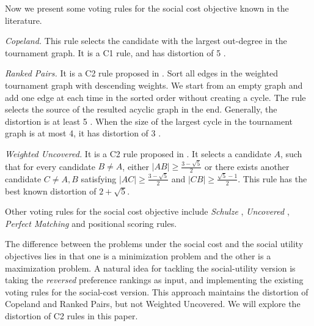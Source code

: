 \documentclass[11pt]{article}
\theoremstyle{remark}
\newcommand{\redcomment}[1]{\textcolor{red}{\textrm{#1}}}
\begin{document}
Now we present some voting rules for the social cost objective known in the literature.

\emph{Copeland.} This rule selects the candidate with the largest out-degree in the tournament graph. It is a C1 rule, and has distortion of 5 \cite{anshelevich2015approximating}.

\emph{Ranked  Pairs.} It is a C2 rule proposed in \cite{tideman1987independence}. Sort all edges in the weighted tournament graph with descending weights. We start from an empty graph and add one edge at each time in the sorted order without creating a cycle. The rule selects the source of the resulted acyclic graph in the end. Generally, the distortion is at least 5 \cite{goel2017metric}. When the size of the largest cycle in the tournament graph is at most 4, it has distortion of 3 \cite{anshelevich2015approximating}.

\emph{Weighted Uncovered.} It is a C2 rule proposed in \cite{munagala2019improved}. It selects a candidate $A$, such that for every candidate $B\ne A$, either $|AB|\ge \frac{3-\sqrt5}{2}$ or there exists another candidate $C\ne A,B$ satisfying $|AC|\ge \frac{3-\sqrt5}{2}$ and $|CB|\ge \frac{\sqrt5-1}{2}$. This  rule has the best known distortion of $2+\sqrt5$.

Other voting rules for the social cost objective include  \emph{Schulze} \cite{schulze2011new}, \emph{Uncovered} \cite{anshelevich2015approximating}, \emph{Perfect Matching} \cite{munagala2019improved} and positional scoring rules.

The difference between the problems under the social cost and the social utility objectives lies in that one is a minimization problem and the other is a maximization problem. A natural idea for tackling the social-utility version is  taking the \emph{reversed} preference rankings as input, and implementing the existing voting rules for the social-cost version. This approach maintains the distortion of Copeland and Ranked Pairs, but not Weighted Uncovered. We will explore the distortion of C2 rules in this paper.


\end{document}
